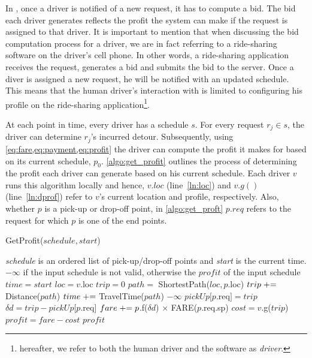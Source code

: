 In \fname, once a driver is notified of a new request, it has to compute a bid. The bid each driver generates reflects the profit the system can make if the request is assigned to that driver. It is important to mention that when discussing the bid computation process for a driver, we are in fact referring to a ride-sharing software on the driver's cell phone. In other words, a ride-sharing application receives the request, generates a bid and submits the bid to the server. Once a diver is assigned a new request, he will be notified with an updated schedule. This means that the human driver's interaction with \fname is limited to configuring his profile on the ride-sharing application\footnote{hereafter, we refer to both the human driver and the software as \textit{driver}.}.

At each point in time, every driver has a schedule $s$. For every request $r_j \in s$, the driver can determine $r_j$'s incurred detour. Subsequently, using \cref{eq:fare,eq:payment,eq:profit} the driver can compute the profit it makes for \fname based on its current schedule, $p_0$. \cref{algo:get_profit} outlines the process of determining the profit each driver can generate based on his current schedule. Each driver $v$ runs this algorithm locally and hence, $v.loc$ (line~\ref{ln:loc}) and $v.g()$ (line~\ref{ln:dprof}) refer to $v$'s current location and profile, respectively. Also, whether $p$ is a pick-up or drop-off point, in \cref{algo:get_proft} $p.req$ refers to the request for which $p$ is one of the end points.

\begin{algorithm}[t]
\caption{GetProfit($schedule, start$)}
\label{algo:get_profit}
\begin{algorithmic}[1]
\REQUIRE \emph{schedule} is an ordered list of pick-up/drop-off points and \emph{start} is the current time.
\ENSURE $-\infty$ if the input schedule is not valid, otherwise the $profit$ of the input schedule
\STATE $time = start$
\STATE $loc = v.$loc\label{ln:loc}
\STATE $trip = 0$
	\STATE $path =$ ShortestPath($loc, p$.loc)
	\STATE $trip \mathrel{+}=$ Distance($path$)
	\STATE $time \mathrel{+}=$ TravelTime($path$)
			\RETURN $-\infty$
		\ENDIF
		\STATE $pickUp[p$.req$]=trip$
	\ENDIF
		\STATE $\delta d = trip - pickUp[p$.req$]$
		\STATE $fare \mathrel{+}= p$.f($\delta d$) $\times$ FARE($p$.req.sp)
		\STATE $cost = v$.g($trip$)\label{ln:dprof}
	\ENDIF
\ENDFOR
\STATE $profit = fare - cost$
\RETURN $profit$
\end{algorithmic}
\end{algorithm}

